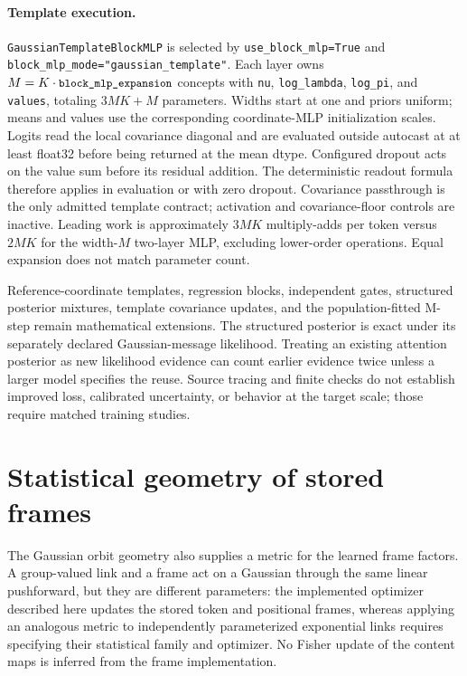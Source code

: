 \documentclass[11pt]{article}
\theoremstyle{definition}
\theoremstyle{remark}
\providecommand{\cfg}[1]{{\small\texttt{#1}}}
\begin{document}
\paragraph{Template execution.}
\cfg{GaussianTemplateBlockMLP} is selected by \cfg{use\_block\_mlp=True} and \cfg{block\_mlp\_mode="gaussian\_template"}. Each layer owns $M=K\cdot\cfg{block\_mlp\_expansion}$ concepts with \cfg{nu}, \cfg{log\_lambda}, \cfg{log\_pi}, and \cfg{values}, totaling $3MK+M$ parameters. Widths start at one and priors uniform; means and values use the corresponding coordinate-MLP initialization scales. Logits read the local covariance diagonal and are evaluated outside autocast at at least float32 before being returned at the mean dtype. Configured dropout acts on the value sum before its residual addition. The deterministic readout formula therefore applies in evaluation or with zero dropout. Covariance passthrough is the only admitted template contract; activation and covariance-floor controls are inactive. Leading work is approximately $3MK$ multiply-adds per token versus $2MK$ for the width-$M$ two-layer MLP, excluding lower-order operations. Equal expansion does not match parameter count.

Reference-coordinate templates, regression blocks, independent gates, structured posterior mixtures, template covariance updates, and the population-fitted M-step remain mathematical extensions. The structured posterior is exact under its separately declared Gaussian-message likelihood. Treating an existing attention posterior as new likelihood evidence can count earlier evidence twice unless a larger model specifies the reuse. Source tracing and finite checks do not establish improved loss, calibrated uncertainty, or behavior at the target scale; those require matched training studies.

\section{Statistical geometry of stored frames}\label{frame:sec:overview}
The Gaussian orbit geometry also supplies a metric for the learned frame factors. A group-valued link and a frame act on a Gaussian through the same linear pushforward, but they are different parameters: the implemented optimizer described here updates the stored token and positional frames, whereas applying an analogous metric to independently parameterized exponential links requires specifying their statistical family and optimizer. No Fisher update of the content maps is inferred from the frame implementation.
\end{document}
